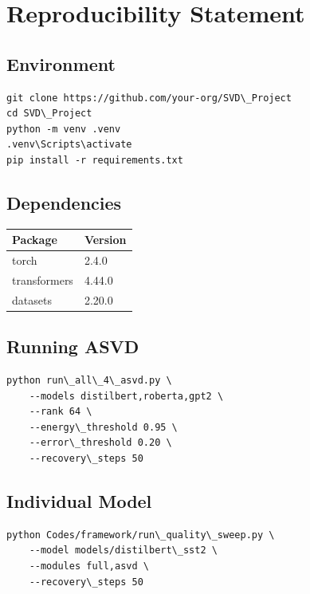 
\section{Reproducibility Statement}

\subsection{Environment}

\begin{lstlisting}
git clone https://github.com/your-org/SVD\_Project
cd SVD\_Project
python -m venv .venv
.venv\Scripts\activate
pip install -r requirements.txt
\end{lstlisting}

\subsection{Dependencies}

\begin{table}[H]
\centering
\small
\begin{tabular}{ll}
\toprule
\textbf{Package} & \textbf{Version} \\
\midrule
torch & 2.4.0 \\
transformers & 4.44.0 \\
datasets & 2.20.0 \\
\bottomrule
\end{tabular}
\end{table}

\subsection{Running ASVD}

\begin{lstlisting}
python run\_all\_4\_asvd.py \
    --models distilbert,roberta,gpt2 \
    --rank 64 \
    --energy\_threshold 0.95 \
    --error\_threshold 0.20 \
    --recovery\_steps 50
\end{lstlisting}

\subsection{Individual Model}

\begin{lstlisting}
python Codes/framework/run\_quality\_sweep.py \
    --model models/distilbert\_sst2 \
    --modules full,asvd \
    --recovery\_steps 50
\end{lstlisting}

